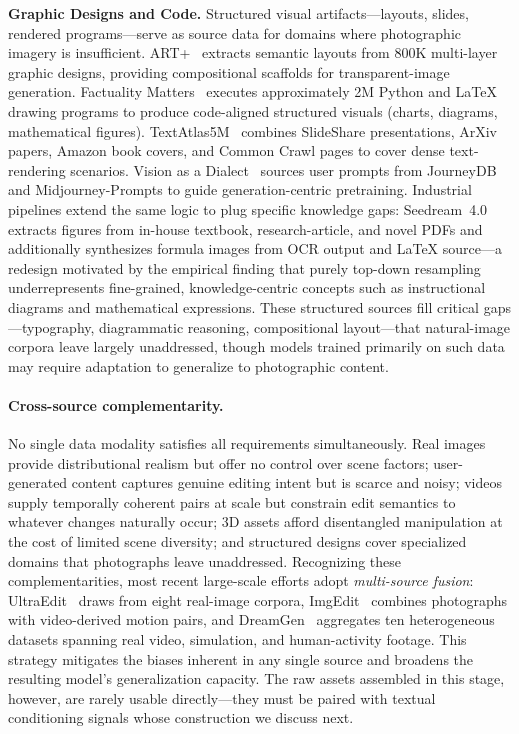 \documentclass{llmxive}
\begin{document}
\textbf{Graphic Designs and Code.}
Structured visual artifacts---layouts, slides, rendered programs---serve as source data for domains where photographic imagery is insufficient. ART+~\citep{pu2025art} extracts semantic layouts from 800K multi-layer graphic designs, providing compositional scaffolds for transparent-image generation. Factuality Matters~\citep{zhuo2025factuality} executes approximately 2M Python and \LaTeX{} drawing programs to produce code-aligned structured visuals (charts, diagrams, mathematical figures). TextAtlas5M~\citep{wang2025textatlas5m} combines SlideShare presentations, ArXiv papers, Amazon book covers, and Common Crawl pages to cover dense text-rendering scenarios. Vision as a Dialect~\citep{han2025vision} sources user prompts from JourneyDB~\citep{sun2023journeydb} and Midjourney-Prompts to guide generation-centric pretraining. Industrial pipelines extend the same logic to plug specific knowledge gaps: Seedream~4.0~\citep{seedream2025seedream} extracts figures from in-house textbook, research-article, and novel PDFs and additionally synthesizes formula images from OCR output and \LaTeX{} source---a redesign motivated by the empirical finding that purely top-down resampling underrepresents fine-grained, knowledge-centric concepts such as instructional diagrams and mathematical expressions. These structured sources fill critical gaps---typography, diagrammatic reasoning, compositional layout---that natural-image corpora leave largely unaddressed, though models trained primarily on such data may require adaptation to generalize to photographic content.

\paragraph{Cross-source complementarity.}
No single data modality satisfies all requirements simultaneously. Real images provide distributional realism but offer no control over scene factors; user-generated content captures genuine editing intent but is scarce and noisy; videos supply temporally coherent pairs at scale but constrain edit semantics to whatever changes naturally occur; 3D assets afford disentangled manipulation at the cost of limited scene diversity; and structured designs cover specialized domains that photographs leave unaddressed. Recognizing these complementarities, most recent large-scale efforts adopt \emph{multi-source fusion}: UltraEdit~\citep{zhao2024ultraedit} draws from eight real-image corpora, ImgEdit~\citep{ye2025imgedit} combines photographs with video-derived motion pairs, and DreamGen~\citep{jang2025dreamgen} aggregates ten heterogeneous datasets spanning real video, simulation, and human-activity footage. This strategy mitigates the biases inherent in any single source and broadens the resulting model's generalization capacity. The raw assets assembled in this stage, however, are rarely usable directly---they must be paired with textual conditioning signals whose construction we discuss next.
\end{document}
